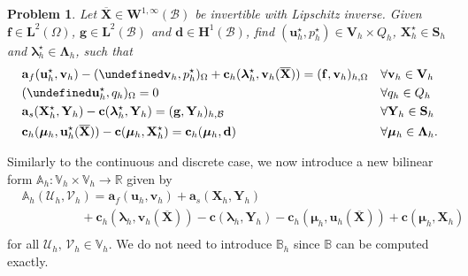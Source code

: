\documentclass[oneside]{amsart} %
\newcommand{\numberset}{\mathbb}
\newcommand{\R}{\numberset{R}}
\newcommand{\A}{\numberset{A}}
\newcommand{\BB}{\numberset{B}}
\newcommand{\VV}{\numberset{V}}
\newtheorem{pro}{Problem}
\let\div\undefined\DeclareMathOperator{\div}{div} %
\newcommand\Hub{\mathbf{H}^1(\B)} %
\newcommand\LdBd{\mathbf{L}^2(\B)} %
\newcommand\LdOd{\mathbf{L}^2(\Omega)} %
\newcommand\Winftyd{\mathbf{W}^{1,\infty}(\B)}
\newcommand\B{\mathcal B} %
\renewcommand\u{\mathbf{u}} %
\renewcommand\a{\mathbf{a}} %
\renewcommand\v{\mathbf{v}} %
\renewcommand\d{\mathbf{d}} %
\renewcommand\c{\mathbf{c}} %
\newcommand\f{\mathbf{f}} %
\newcommand\g{\mathbf{g}} %
\renewcommand\S{\mathbf{S}} %
\newcommand\V{\mathcal{V}} %
\newcommand\U{\mathcal{U}} %
\newcommand\X{\mathbf{X}} %
\newcommand\Xbar{\overline{\X}} %
\newcommand\Y{\mathbf{Y}} %
\newcommand\LL{{\boldsymbol{\Lambda}}} %
\newcommand\Vline{\mathbf{V}} %
\newcommand\Sline{\S} %
\newcommand\llambda{\boldsymbol\lambda} %
\newcommand\mmu{{\boldsymbol\mu}} %
\newcommand{\crhs}[2]{\c_h(#1,#2)}
\begin{document}
	\begin{pro}
		\label{pro:approx_stationary_general}
		Let $\Xbar\in\Winftyd$ be invertible with Lipschitz inverse. Given $\f\in \LdOd$, $\g\in \LdBd$ and $\d\in\Hub$, find $(\u_h^\star,p_h^\star)\in\Vline_h \times Q_h$, $\X_h^\star\in \Sline_h$ and $\llambda_h^\star\in \LL_h$, such that
		\begin{subequations}
			\begin{align}
				&\a_{f}(\u_h^\star,\v_h)-(\div\v_h,p_h^\star)_\Omega+\c_h(\llambda_h^\star,\v_h(\Xbar))=(\f,\v_h)_{h,\Omega} && %
				\forall\v_h\in\Vline_h\\
				&\label{div_ex}(\div\u_h^\star,q_h)_\Omega=0&&\forall q_h\in Q_h\\
				& \a_{s}(\X_h^\star,\Y_h)-\c(\llambda_h^\star,\Y_h)=(\g,\Y_h)_{h,\B}&&\forall\Y_h\in \Sline_h \\
				& \c_h(\mmu_h,\u_h^\star(\Xbar))-\c(\mmu_h,\X_h^\star)=\crhs{\mmu_h}{\d}&&\forall\mmu_h\in \LL_h.
			\end{align}
		\end{subequations}
	\end{pro}
	
	Similarly to the continuous and discrete case, we now introduce a new bilinear form ${\A_h:\VV_h\times\VV_h\rightarrow\R}$ given by
	\begin{equation}
		\begin{aligned}
			&\A_h(\U_h,\V_h) = \a_{f}(\u_h,\v_h) + \a_{s}(\X_h,\Y_h)\\
			&\hspace{2cm} + \c_h(\llambda_h,\v_h(\Xbar)) - \c(\llambda_h,\Y_h) - \c_h(\mmu_h,\u_h(\Xbar)) + \c(\mmu_h,\X_h)\\
		\end{aligned}
	\end{equation}
	for all $\U_h,\,\V_h\in\VV_h$. We do not need to introduce $\BB_h$ since $\BB$ can be computed exactly.
	
\end{document}
